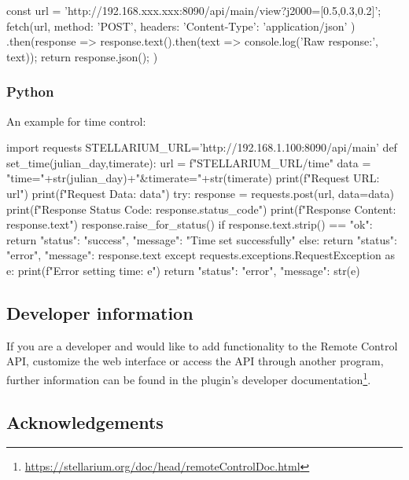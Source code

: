 \begin{commandsScr}
const url = 'http://192.168.xxx.xxx:8090/api/main/view?j2000=[0.5,0.3,0.2]';
fetch(url, {
    method: 'POST',
    headers: {
      'Content-Type': 'application/json'
    }
  })
  .then(response => {
    response.text().then(text => console.log('Raw response:', text));
    return response.json();
  })
\end{commandsScr}

\subsubsection{Python}
\label{sec:plugins:RemoteControl:API:Python}

An example for time control:
\begin{commandsScr}
import requests
STELLARIUM_URL='http://192.168.1.100:8090/api/main'
def set_time(julian_day,timerate):
    url = f"{STELLARIUM_URL}/time"
    data = "time="+str(julian_day)+"&timerate="+str(timerate)
    print(f"Request URL: {url}")
    print(f"Request Data: {data}")
    try:
        response = requests.post(url, data=data)
        print(f"Response Status Code: {response.status_code}")
        print(f"Response Content: {response.text}")
        response.raise_for_status()
        if response.text.strip() == "ok":
            return {"status": "success", "message": "Time set successfully"}
        else:
            return {"status": "error", "message": response.text}
    except requests.exceptions.RequestException as e:
        print(f"Error setting time: {e}")
        return {"status": "error", "message": str(e)}
\end{commandsScr}

  
\subsection{Developer information}
\label{sec:plugins:RemoteControl:developer}

If you are a developer and would like to add functionality to the Remote 
Control API, customize the web interface or access the API through another 
program, further information can be found in the plugin's 
developer documentation\footnote{\url{https://stellarium.org/doc/head/remoteControlDoc.html}}.

\subsection{Acknowledgements}

